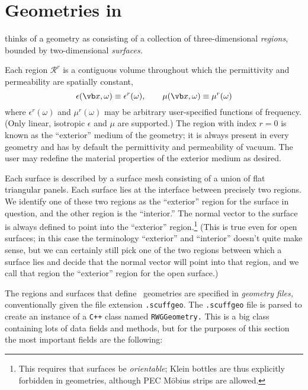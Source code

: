 \newpage
\section{Geometries in \lss}
\label{GeometriesSection}

\lss thinks of a geometry as consisting of a collection
of three-dimensional \textit{regions}, bounded by 
two-dimensional \textit{surfaces.}

Each region $\mathcal{R}^r$ is a contiguous volume
throughout which the permittivity and permeability are 
spatially constant,
$$ \epsilon(\vb x, \omega) \equiv \epsilon^r(\omega), \qquad
   \mu(\vb x, \omega)      \equiv \mu^r(\omega)
$$
where $\epsilon^r(\omega)$ and $\mu^r(\omega)$ may
be arbitrary user-specified functions of frequency. 
(Only linear, isotropic $\epsilon$ and $\mu$ are supported.)
The region with index $r=0$ is known as the 
``exterior'' medium of the \lss geometry; it is 
always present in every \lss geometry and has by 
default the permittivity and permeability of vacuum. 
The user may redefine the material properties of the 
exterior medium as desired.

Each surface is described by a surface mesh consisting of 
a union of flat triangular panels. 
Each surface lies at the interface between precisely two 
regions. We identify one of these two regions as 
the ``exterior'' region for the surface in question,
and the other region is the ``interior.'' The normal 
vector to the surface is always defined to point into 
the ``exterior'' region.\footnote{This requires that 
surfaces be \textit{orientable}; Klein bottles are thus 
explicitly forbidden in \lss geometries, although PEC 
M\"obius strips are allowed.} (This is true even for 
open surfaces; in this case the terminology ``exterior'' 
and ``interior'' doesn't quite make sense, but we can 
certainly still pick one of the two regions between
which a surface lies and decide that the normal vector
will point into that region, and we call that region
the ``exterior'' region for the open surface.)

The regions and surfaces that define \lss\, geometries are 
specified in \textit{geometry files,} conventionally given the 
file extension \texttt{.scuffgeo}. The \texttt{.scuffgeo}
file is parsed to create an instance of a \texttt{C++} 
class named \texttt{RWGGeometry.} This is a big class 
containing lots of data fields and methods, but 
for the purposes of this section the most important 
fields are the following:


